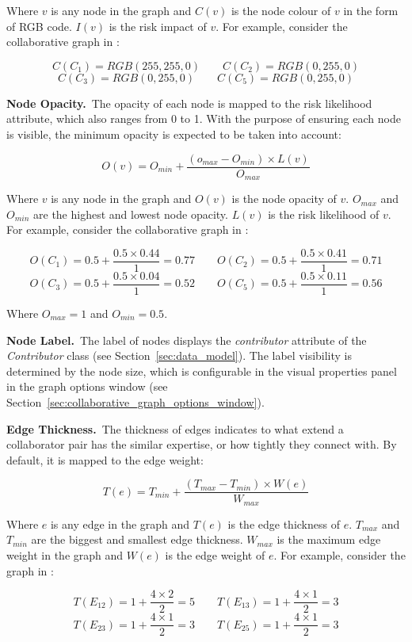 Where \(v\) is any node in the graph and \(C(v)\) is the node colour of \(v\) in the form of RGB code. \(I(v)\) is the risk impact of \(v\). For example, consider the collaborative graph in :

\[C(C_{1})=RGB(255,255,0) \quad \quad C(C_{2})=RGB(0,255,0)\]
\[C(C_{3})=RGB(0,255,0) \quad \quad C(C_{5})=RGB(0,255,0)\]

\textbf{Node Opacity.}~The opacity of each node is mapped to the risk likelihood attribute, which also ranges from 0 to 1. With the purpose of ensuring each node is visible, the minimum opacity is expected to be taken into account:

\[O(v)=O_{min} + \frac{(o_{max} - O_{min}) \times L(v)}{O_{max}}\]

Where \(v\) is any node in the graph and \(O(v)\) is the node opacity of \(v\). \(O_{max}\) and \(O_{min}\) are the highest and lowest node opacity. \(L(v)\) is the risk likelihood of \(v\). For example, consider the collaborative graph in :

\[O(C_{1})=0.5 + \frac{0.5 \times 0.44}{1}=0.77 \quad \quad O(C_{2})=0.5 + \frac{0.5 \times 0.41}{1}=0.71\]
\[O(C_{3})=0.5 + \frac{0.5 \times 0.04}{1}=0.52 \quad \quad O(C_{5})=0.5 + \frac{0.5 \times 0.11}{1}=0.56\]

Where \(O_{max} = 1\) and \(O_{min} = 0.5\).

\textbf{Node Label.}~The label of nodes displays the \emph{contributor} attribute of the \emph{Contributor} class (see Section~\ref{sec:data_model}). The label visibility is determined by the node size, which is configurable in the visual properties panel in the graph options window (see Section~\ref{sec:collaborative_graph_options_window}).

\textbf{Edge Thickness.}~The thickness of edges indicates to what extend a collaborator pair has the similar expertise, or how tightly they connect with. By default, it is mapped to the edge weight:

\[T(e)=T_{min} + \frac{(T_{max} - T_{min}) \times W(e)}{W_{max}}\]

Where \(e\) is any edge in the graph and \(T(e)\) is the edge thickness of \(e\). \(T_{max}\) and \(T_{min}\) are the biggest and smallest edge thickness. \(W_{max}\) is the maximum edge weight in the graph and \(W(e)\) is the edge weight of \(e\). For example, consider the graph in :

\[T(E_{12})=1 + \frac{4 \times 2}{2}=5 \quad \quad T(E_{13})=1 + \frac{4 \times 1}{2}=3\]
\[T(E_{23})=1 + \frac{4 \times 1}{2}=3 \quad \quad T(E_{25})=1 + \frac{4 \times 1}{2}=3\]

